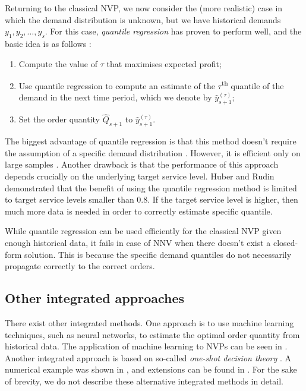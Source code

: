 \documentclass{article}
\begin{document}
Returning to the classical NVP, we now consider the (more realistic) case in which the demand distribution is unknown, but we have historical demands $y_1,y_2,\dots,y_s$.
For this case, \emph{quantile regression}
has proven to perform well, and the basic idea is as follows \cite{BT06,Br16,CS19,HNS15,Hu19}:
\begin{enumerate}
\item Compute the value of $\tau$ that maximises expected profit;
\item Use quantile regression to compute an estimate of the $\tau$\textsuperscript{th} quantile of the demand in the next time period, which we denote by $\hat{y}_{s+1}^{(\tau)}$;
\item Set the order quantity $\hat{Q}_{s+1}$ to $\hat{y}_{s+1}^{(\tau)}$.
\end{enumerate}

The biggest advantage of quantile regression is that this method doesn't require the assumption of a specific demand distribution \cite{Hu19}. However, it is efficient only on large samples \cite{Hu19,RV19}. Another drawback is that the performance of this approach depends crucially on the underlying target service level. Huber \cite{Hu19} and Rudin \cite{RV19} demonstrated that the benefit of using the quantile regression method is limited to target service levels smaller than 0.8. If the target service level is higher, then much more data is needed in order to correctly estimate specific quantile.

While quantile regression can be used efficiently for the classical NVP given enough historical data, it fails in case of NNV when there doesn't exist a closed-form solution. This is because the specific demand quantiles do not necessarily propagate correctly to the correct orders.

\subsection{Other integrated approaches} %

There exist other integrated methods. One approach is to use machine learning techniques, such as neural networks, to estimate the optimal order quantity from historical data. The application of machine learning to NVPs can be seen in \cite{CS19,OST20,RV19}. Another integrated approach is based on so-called \emph{one-shot decision theory} \cite{Guo11,GM14,Ma19}. A numerical example was shown in \cite{Guo11}, and extensions can be found in \cite{Ma19}. For the sake of brevity, we do not describe these alternative integrated methods in detail.
\end{document}
